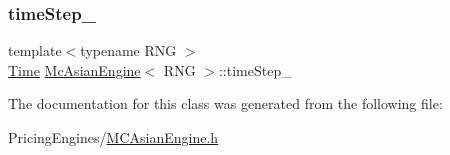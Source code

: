 \hypertarget{class_mc_asian_engine_a0dadab191a7097d0e474ebf084f6bca8}{}\label{class_mc_asian_engine_a0dadab191a7097d0e474ebf084f6bca8} 
\subsubsection{\texorpdfstring{time\+Step\+\_\+}{timeStep\_}}
{\footnotesize\ttfamily template$<$typename R\+NG $>$ \\
\hyperlink{_name_def_8h_ac2d3e0ba793497bcca555c7c2cf64ff3}{Time} \hyperlink{class_mc_asian_engine}{Mc\+Asian\+Engine}$<$ R\+NG $>$\+::time\+Step\+\_\+\hspace{0.3cm}{\ttfamily [private]}}



The documentation for this class was generated from the following file\+:\begin{DoxyCompactItemize}
\item 
Pricing\+Engines/\hyperlink{_m_c_asian_engine_8h}{M\+C\+Asian\+Engine.\+h}\end{DoxyCompactItemize}
